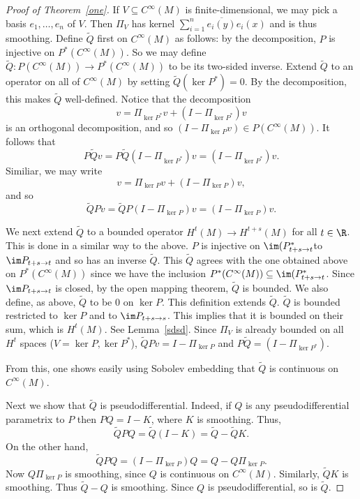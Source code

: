 \documentclass[12pt]{article}
\begin{document}
\begin{proof}[Proof of Theorem~\ref{one}]
If $V \subseteq C^\infty(M)$ is finite-dimensional, we may pick a basis $e_1,\ldots, e_n$ of $V$. Then $\Pi_V$ has kernel $\sum_{i=1}^n \overline{e_i(y)}e_i(x)$ and is thus smoothing. Define $\tilde{Q}$ first on $C^\infty(M)$ as follows: by the decomposition, $P$ is injective on $P^\ast(C^\infty(M))$. So we may define $\tilde{Q}:P(C^\infty(M)) \to P^\ast(C^\infty(M))$ to be its two-sided inverse. Extend $\tilde{Q}$ to an operator on all of $C^\infty(M)$ by setting $\tilde{Q}(\ker P^\ast) = 0$. By the decomposition, this makes $\tilde{Q}$ well-defined. Notice that the decomposition
\[v = \Pi_{\ker P^\ast}v + (I-\Pi_{\ker P^\ast})v\] is an orthogonal decomposition, and so $(I-\Pi_{\ker P}v) \in P(C^\infty(M))$. It follows that 
\[P\tilde{Q}v = P\tilde{Q}(I-\Pi_{\ker P^\ast})v = (I-\Pi_{\ker P^\ast})v.\] Similiar, we may write
\[v = \Pi_{\ker P}v + (I-\Pi_{\ker P})v,\] and so
\[\tilde{Q}Pv = \tilde{Q}P(I-\Pi_{\ker P})v = (I-\Pi_{\ker P})v.\]

We next extend $\tilde{Q}$ to a bounded operator $H^{t}(M) \to H^{t+s}(M)$ for all $t \in \R$. This is done in a similar way to the above. $P$ is injective on $\im (P^\ast_{t+s\to t}$to $\im P_{t+s\to t}$ and so has an inverse $\tilde{Q}$. This $\tilde{Q}$ agrees with the one obtained above on $P^\ast(C^\infty(M))$ since we have the inclusion $P^\ast(C^\infty(M)) \subseteq \im (P^\ast_{t+s\to t}$. Since $\im P_{t+s \to t}$ is closed, by the open mapping theorem, $\tilde{Q}$ is bounded. We also define, as above, $\tilde{Q}$ to be $0$ on $\ker P$. This definition extends $\tilde{Q}$. $\tilde{Q}$ is bounded restricted to $\ker P$ and to $\im P_{t+s\to s}$. This implies that it is bounded on their sum, which is $H^{t}(M)$. See Lemma~\ref{sdsd}. Since $\Pi_{V}$ is already bounded on all $H^{t}$ spaces ($V = \ker P, \ker P^\ast$), $\tilde{Q}Pv = I-\Pi_{\ker P}$ and $P\tilde{Q} = (I-\Pi_{\ker P^\ast})$.

From this, one shows easily using Sobolev embedding that $\tilde{Q}$ is continuous on $C^\infty(M)$.

Next we show that $\tilde{Q}$ is pseudodifferential. Indeed, if $Q$ is any pseudodifferential parametrix to $P$ then $PQ = I-K$, where $K$ is smoothing. Thus,
\[\tilde{Q}PQ = \tilde{Q}(I-K) = \tilde{Q}-\tilde{Q}K.\] On the other hand,
\[\tilde{Q}PQ = (I-\Pi_{\ker P})Q = Q-Q\Pi_{\ker P}.\] Now $Q\Pi_{\ker P}$ is smoothing, since $Q$ is continuous on $C^\infty(M)$. Similarly, $\tilde{Q}K$ is smoothing. Thus $\tilde{Q}-Q$ is smoothing. Since $Q$ is pseudodifferential, so is $\tilde{Q}$.


\end{proof}
\end{document}
